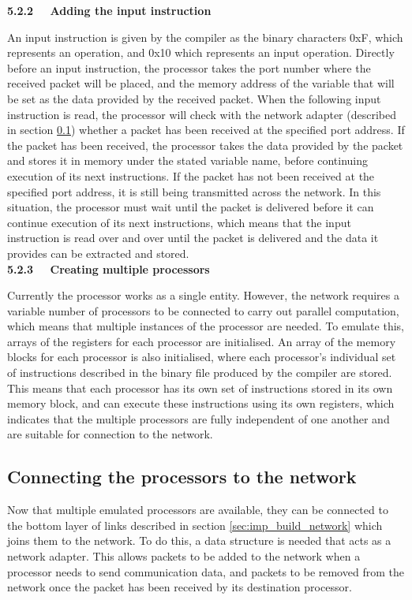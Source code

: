 \documentclass[a4paper, 12pt]{article}
\begin{document}
\noindent\textbf{5.2.2 \ \ Adding the input instruction}

\noindent An input instruction is given by the compiler as the binary characters 0xF, which represents an operation, and 0x10 which represents an input operation. Directly before an input instruction, the processor takes the port number where the received packet will be placed, and the memory address of the variable that will be set as the data provided by the received packet.  When the following input instruction is read, the processor will check with the network adapter (described in section \ref{sec:imp_network_adapter}) whether a packet has been received at the specified port address. If the packet has been received, the processor takes the data provided by the packet and stores it in memory under the stated variable name, before continuing execution of its next instructions. If the packet has not been received at the specified port address, it is still being transmitted across the network. In this situation, the processor must wait until the packet is delivered before it can continue execution of its next instructions, which means that the input instruction is read over and over until the packet is delivered and the data it provides can be extracted and stored.\\

\noindent\textbf{5.2.3 \ \ Creating multiple processors}

\noindent Currently the processor works as a single entity. However, the network requires a variable number of processors to be connected to carry out parallel computation, which means that multiple instances of the processor are needed. To emulate this, arrays of the registers for each processor are initialised. An array of the memory blocks for each processor is also initialised, where each processor's individual set of instructions described in the binary file produced by the compiler are stored. This means that each processor has its own set of instructions stored in its own memory block, and can execute these instructions using its own registers, which indicates that the multiple processors are fully independent of one another and are suitable for connection to the network.

\subsection{Connecting the processors to the network}
\label{sec:imp_network_adapter}

Now that multiple emulated processors are available, they can be connected to the bottom layer of links described in section \ref{sec:imp_build_network} which joins them to the network. To do this, a data structure is needed that acts as a network adapter. This allows packets to be added to the network when a processor needs to send communication data, and packets to be removed from the network once the packet has been received by its destination processor.\\
\end{document}
